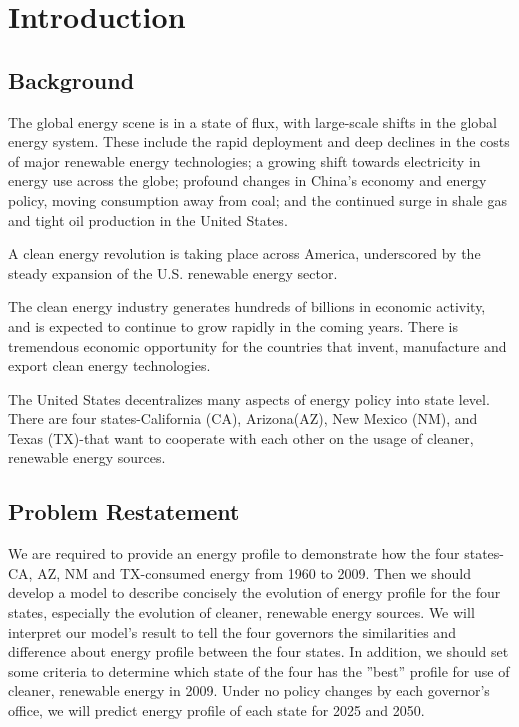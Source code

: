 \documentclass{mcmthesis}
\begin{document}
\newpage

\pagestyle{fancy}

\setcounter{page}{1}
\section{Introduction}
\subsection{Background}

The global energy scene is in a state of flux, with large-scale shifts in the global energy system. These include the rapid deployment and deep declines in the costs of major renewable energy technologies; a growing shift towards electricity in energy use across the globe; profound changes in China's economy and energy policy, moving consumption away from coal; and the continued surge in shale gas and tight oil production in the United States\cite{OECD/IEA}.

A clean energy revolution is taking place across America, underscored by the steady expansion of the U.S. renewable energy sector.

The clean energy industry generates hundreds of billions in economic activity, and is expected to continue to grow rapidly in the coming years. There is tremendous economic opportunity for the countries that invent, manufacture and export clean energy technologies.

The United States decentralizes many aspects of energy policy into state level. There are four states-California (CA), Arizona(AZ), New Mexico (NM), and Texas (TX)-that want to cooperate with each other on the usage of cleaner, renewable energy sources.

\subsection{Problem Restatement}

We are required to provide an energy profile to demonstrate how the four states- CA, AZ, NM and TX-consumed energy from 1960 to 2009. Then we should develop a model to describe concisely the evolution of energy profile for the four states, especially the evolution of cleaner, renewable energy sources. We will interpret our model's result to tell the four governors the similarities and difference about energy profile between the four states. In addition, we should set some criteria to determine which state of the four has the ''best'' profile for use of cleaner, renewable energy in 2009. Under no policy changes by each governor's office, we will predict energy profile of each state for 2025 and 2050.
\end{document}

